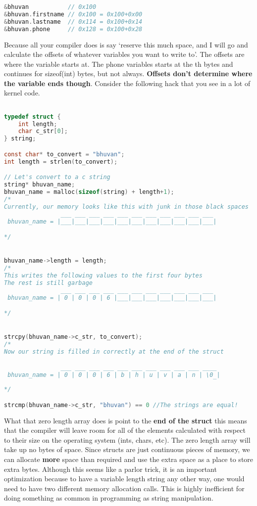 \begin{lstlisting}[language=C]
&bhuvan           // 0x100
&bhuvan.firstname // 0x100 = 0x100+0x00
&bhuvan.lastname  // 0x114 = 0x100+0x14
&bhuvan.phone     // 0x128 = 0x100+0x28
\end{lstlisting}

Because all your compiler does is say `reserve this much space, and I will go and calculate the offsets of whatever variables you want to write to'. The offsets are where the variable starts at. The phone variables starts at the th bytes and continues for sizeof(int) bytes, but not always. \textbf{Offsets don't determine where the variable ends though}. Consider the following hack that you see in a lot of kernel code.

\begin{lstlisting}[language=C]

typedef struct {
    int length;
    char c_str[0];
} string;

const char* to_convert = "bhuvan";
int length = strlen(to_convert);

// Let's convert to a c string
string* bhuvan_name;
bhuvan_name = malloc(sizeof(string) + length+1);
/*
Currently, our memory looks like this with junk in those black spaces
                ___ ___ ___ ___ ___ ___ ___ ___ ___ ___ ___
 bhuvan_name = |___|___|___|___|___|___|___|___|___|___|___|

*/


bhuvan_name->length = length;
/*
This writes the following values to the first four bytes
The rest is still garbage
                ___ ___ ___ ___ ___ ___ ___ ___ ___ ___ ___
 bhuvan_name = | 0 | 0 | 0 | 6 |___|___|___|___|___|___|___|

*/


strcpy(bhuvan_name->c_str, to_convert);
/*
Now our string is filled in correctly at the end of the struct

                ___ ___ ___ ___ ___ ___ ___ ___ ___ ___ ____
 bhuvan_name = | 0 | 0 | 0 | 6 | b | h | u | v | a | n | \0 |
                                                           ‾
*/

strcmp(bhuvan_name->c_str, "bhuvan") == 0 //The strings are equal!
\end{lstlisting}

What that zero length array does is point to the \textbf{end of the struct} this means that the compiler will leave room for all of the elements calculated with respect to their size on the operating system (ints, chars, etc). The zero length array will take up no bytes of space.
Since structs are just continuous pieces of memory, we can allocate \textbf{more} space than required and use the extra space as a place to store extra bytes.
Although this seems like a parlor trick, it is an important optimization because to have a variable length string any other way, one would need to have two different memory allocation calls.
This is highly inefficient for doing something as common in programming as string manipulation.

